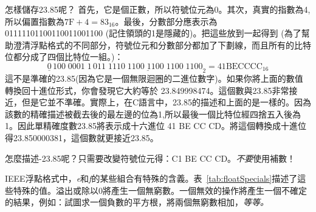 怎樣儲存23.85呢？ 首先，它是個正數，所以符號位元為0。其次，真實的指數為4,所以偏置指數為$7\mathrm{F}
+ 4 = 83_{16}$。最後，分數部分應表示為01111101100110011001100
(記住領頭的1是隱藏的)。把這些放到一起得到
(為了幫助澄清浮點格式的不同部分，符號位元和分數部分都加了下劃線，而且所有的比特位都分成了四個比特位一組。)：
\[ \underline{0}\,100\;0001\;1
   \,\underline{011\;1110\;1100\;1100\;1100\;1100}_2 = 41 \mathrm{BE}
\mathrm{CC} \mathrm{CC}_{16} \]
這不是準確的23.85(因為它是一個無限迴圈的二進位數字)。如果你將上面的數值轉換回十進位形式，你會發現它大約等於
23.849998474。這個數與23.85非常接近，但是它並不準確。實際上，在C語言中，23.85的描述和上面的是一樣的。因為該數的精確描述被截去後的最左邊的位為1,所以最後一個比特位經四捨五入後為1。因此單精確度數23.85將表示成十六進位
41 BE CC CD。將這個轉換成十進位得23.850000381，這個數就更接近23.85。

怎麼描述-23.85呢？只需要改變符號位元得：C1 BE CC
CD。\emph{不要}使用補數！

\begin{table}[t]
 \caption{\emph{f}和\emph{e}的特殊值\label{tab:floatSpecials}}
\end{table}

IEEE浮點格式中，\emph{e}和\emph{f}的某些組合有特殊的含義。表~\ref{tab:floatSpecials}描述了這些特殊的值。溢出或除以0將產生一個無窮數。一個無效的操作將產生一個不確定的結果，例如：試圖求一個負數的平方根，將兩個無窮數相加，\emph{等等。}

